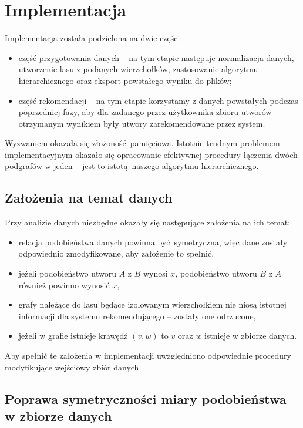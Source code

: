 \documentclass[a4paper,10pt]{article}
\begin{document}
\section{Implementacja}

Implementacja została podzielona na dwie części:
\begin{itemize}
 \item część przygotowania danych -- na tym etapie następuje normalizacja danych, 
	utworzenie lasu z podanych wierzchołków, zastosowanie algorytmu hierarchicznego oraz eksport powstałego wyniku do plików;
 \item część rekomendacji -- na tym etapie korzystamy z danych powstałych podczas poprzedniej fazy, 
	aby dla zadanego przez użytkownika zbioru utworów otrzymanym wynikiem były utwory zarekomendowane przez system.
\end{itemize}

Wyzwaniem okazała się złożoność pamięciowa. 
Istotnie trudnym problemem implementacyjnym okazało się opracowanie efektywnej procedury łączenia dwóch podgrafów w jeden -- 
jest to istotą naszego algorytmu hierarchicznego.

\subsection{Założenia na temat danych}

Przy analizie danych niezbędne okazały się następujące założenia na ich temat:
\begin{itemize}
 \item relacja podobieństwa danych powinna być symetryczna, więc dane zostały odpowiednio zmodyfikowane, aby założenie to spełnić,
 \item jeżeli podobieństwo utworu $A$ z $B$ wynosi $x$, podobieństwo utworu $B$ z $A$ również powinno wynosić $x$,
 \item grafy należące do lasu będące izolowanym wierzchołkiem nie niosą istotnej informacji dla systemu rekomendującego -- zostały one odrzucone,
 \item jeżeli w grafie istnieje krawędź $\left(v, w\right)$ to $v$ oraz $w$ istnieje w zbiorze danych.
\end{itemize}

Aby spełnić te założenia w implementacji uwzględniono odpowiednie procedury modyfikujące wejściowy zbiór danych.

\subsection{Poprawa symetryczności miary podobieństwa w zbiorze danych}
\end{document}

